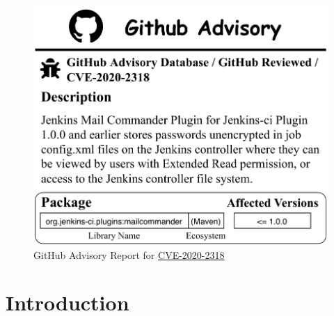 \begin{figure}[h]
\centering
\includegraphics[width=1\linewidth]{figures/vulnerability-report.drawio.pdf}
\caption{GitHub Advisory Report for \href{https://github.com/advisories/GHSA-485q-v457-3p58}{CVE-2020-2318}}
\label{fig: case}
\vspace{-0.4cm}
\end{figure}

\section{Introduction}
\label{sec:intro}

